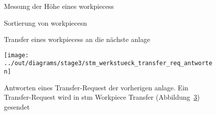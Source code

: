 \begin{figure}
    \caption{Messung der Höhe eines \glspl{workpiece}s}
    \label{fig:stm_hoehe_messen}
\end{figure}

\begin{figure}
    \caption{Sortierung von \glspl{workpiece}n}
    \label{fig:stm_werkstueck_sortieren}
\end{figure}

\begin{figure}
    \caption{Transfer eines \glspl{workpiece}s an die nächste \gls{anlage}}
    \label{fig:stm_werkstueck_transfer}
\end{figure}

\begin{figure}
    \centering
    \texttt{[image: ../out/diagrams/stage3/stm\_werkstueck\_transfer\_req\_antworten]}
    \caption{Antworten eines Transfer-Request der vorherigen \gls{anlage}.
    Ein Transfer-Request wird in stm Workpiece Transfer (Abbildung~\ref{fig:stm_werkstueck_transfer}) gesendet}
    \label{fig:stm_werkstueck_transfer_req_antworten}
\end{figure}



